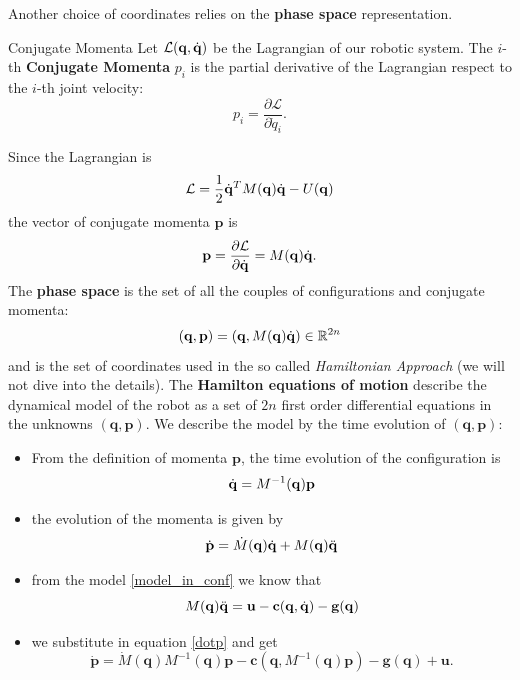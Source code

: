 \documentclass[10pt, a4paper]{report}
\newcommand{\q}{{\mathbf q}}
\begin{document}
Another choice of coordinates relies on the \textbf{phase space} representation. \begin{boxdefinition}{Conjugate Momenta}{}
    Let $\mathcal L(\q,\dq)$ be the Lagrangian of our robotic system. The $i$-th \textbf{Conjugate Momenta} $p_i$ is the partial derivative of the Lagrangian respect to the $i$-th joint velocity:\begin{equation}
        p_i=\frac{\partial \mathcal L}{\partial \dot q_i}.
    \end{equation}
\end{boxdefinition}
Since the Lagrangian is\begin{equation}
    \mathcal L = \frac{1}{2}\dq^T M(\q)\dq - U(\q)
\end{equation}
the vector of conjugate momenta $\mathbf p$ is\begin{equation}
    \mathbf p=\frac{\partial \mathcal L}{\partial\dq}=M(\q)\dq.
\end{equation}
The \textbf{phase space} is the set of all the couples of configurations and conjugate momenta:\begin{equation}
    (\q,\mathbf p)=\left(\q,M(\q)\dq\right)\in \R^{2n}
\end{equation}
and is the set of coordinates used in the so called \textit{Hamiltonian Approach} (we will not dive into the details). The \textbf{Hamilton equations of motion} describe the dynamical model of the robot as a set of $2n$ first order differential equations in the unknowns $(\q,\mathbf p)$.
We describe the model by the  time evolution of $(\q,\mathbf p)$:
\begin{itemize}
    \item From the definition of momenta $\mathbf p$, the time evolution of the configuration is\begin{equation}
        \dq=M^{-1}(\q)\mathbf p
    \end{equation}
    \item the evolution of the momenta is given by\begin{equation}\label{dotp}
        \dot{\mathbf p}=\dot M(\q)\dq+M(\q)\ddq
    \end{equation}
    \item from the model \eqref{model_in_conf} we know that\begin{equation}\label{Mq}
        M(\q)\ddq=\mathbf u-\mathbf c(\q,\dq)-\mathbf g(\q)
    \end{equation}
    \item we substitute in equation \eqref{dotp} and get\begin{equation}\label{derivata_p}
        \dot{\mathbf p} = \dot{M}(\q)M^{-1}(\q)\mathbf  p - \mathbf  c(\q, M^{-1}(\q)\mathbf p) -\mathbf  g(\mathbf q) +\mathbf  u.
    \end{equation}
\end{itemize}
\end{document}
